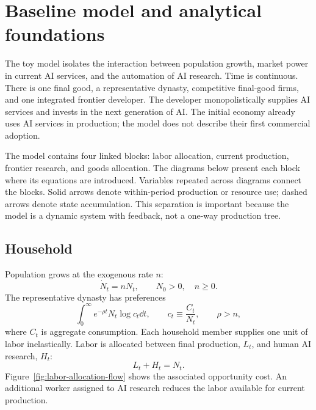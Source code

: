 \section{Baseline model and analytical foundations}
\label{sec:toy}

The toy model isolates the interaction between population growth, market power in
current AI services, and the automation of AI research. Time is continuous. There is
one final good, a representative dynasty, competitive final-good firms, and one
integrated frontier developer. The developer monopolistically supplies AI services
and invests in the next generation of AI. The initial economy already uses AI
services in production; the model does not describe their first commercial adoption.

The model contains four linked blocks: labor allocation, current production, frontier
research, and goods allocation. The diagrams below present each block where its
equations are introduced. Variables repeated across diagrams connect the blocks.
Solid arrows denote within-period production or resource use; dashed arrows denote
state accumulation. This separation is important because the model is a dynamic
system with feedback, not a one-way production tree.


\subsection{Household}

Population grows at the exogenous rate $n$:
\begin{equation}
    \dot N_t=nN_t,
    \qquad N_0>0,\quad n\geq0.
    \label{eq:population}
\end{equation}
The representative dynasty has preferences
\begin{equation}
    \int_0^\infty e^{-\rho t}N_t\log c_t\dd t,
    \qquad
    c_t\equiv\frac{C_t}{N_t},
    \qquad \rho>n,
    \label{eq:utility}
\end{equation}
where $C_t$ is aggregate consumption. Each household member supplies one unit of
labor inelastically. Labor is allocated between final production, $L_t$, and
human AI research, $H_t$:
\begin{equation}
    L_t+H_t=N_t.
    \label{eq:labor-clearing}
\end{equation}
Figure~\ref{fig:labor-allocation-flow} shows the associated opportunity cost. An
additional worker assigned to AI research reduces the labor available for current
production.

